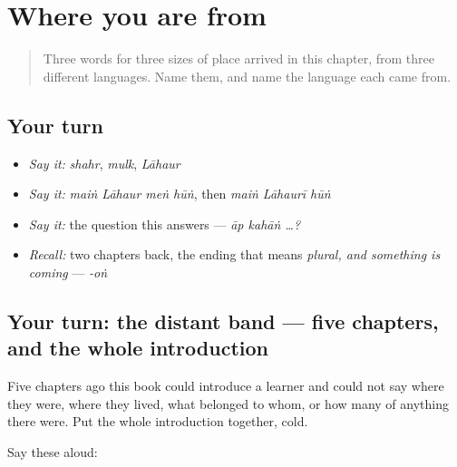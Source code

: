 \section[\texorpdfstring{\ur{شہر} · \ur{ملک} … (shahr · mulk …)}{شہر · ملک … (shahr · mulk …)}]{Where you are from}

\label{lesson:UR-R27-where-you-are-from}



\begin{quote}
Three words for three sizes of place arrived in this chapter, from three different languages. Name them, and name the language each came from.
\end{quote}

\subsection*{Your turn}
\begin{itemize}
\raggedright
  \item \emph{Say it:} \emph{shahr}, \emph{mulk}, \emph{Lāhaur}
  \item \emph{Say it:} \emph{maiṅ Lāhaur meṅ hūṅ}, then \emph{maiṅ Lāhaurī hūṅ}
  \item \emph{Say it:} the question this answers — \emph{āp kahāṅ …?}
  \item \emph{Recall:} two chapters back, the ending that means \emph{plural, and something is coming} — \emph{-oṅ}
\end{itemize}

\subsection*{Your turn: the distant band — five chapters, and the whole introduction}
Five chapters ago this book could introduce a learner and could not say where they were, where they lived, what belonged to whom, or how many of anything there were. Put the whole introduction together, cold.

Say these aloud:

